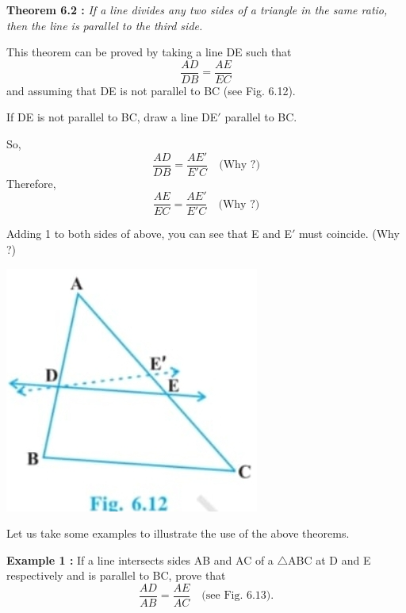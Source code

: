 \documentclass[a4paper,12pt]{article}
\begin{document}
\pagestyle{fancy}
\fancyhf{}
{\color{ncertblue}\textbf{Theorem 6.2 :} 
\textit{If a line divides any two sides of a triangle in the same ratio, then the line is parallel to the third side.}}

This theorem can be proved by taking a line DE such that 
\[
\frac{AD}{DB} = \frac{AE}{EC}
\]
and assuming that DE is not parallel to BC (see Fig. 6.12). 

If DE is not parallel to BC, draw a line DE$'$ parallel to BC.

\begin{multicols}{2}
So, 
\[
\frac{AD}{DB} = \frac{AE'}{E'C} \quad \text{(Why ?)}
\]
Therefore,
\[
\frac{AE}{EC} = \frac{AE'}{E'C} \quad \text{(Why ?)}
\]

Adding 1 to both sides of above, you can see that E and E$'$ must coincide. (Why ?)

\columnbreak

\begin{center}
    \includegraphics[width=0.9\linewidth]{fig612.jpg}\\
\end{center}
\end{multicols}

Let us take some examples to illustrate the use of the above theorems.

{\color{ncertblue}\textbf{Example 1 :}} If a line intersects sides AB and AC of a $\triangle$ABC at D and E respectively and is parallel to BC, prove that 
\[
\frac{AD}{AB} = \frac{AE}{AC} \quad \text{(see Fig. 6.13).}
\]
\end{document}
